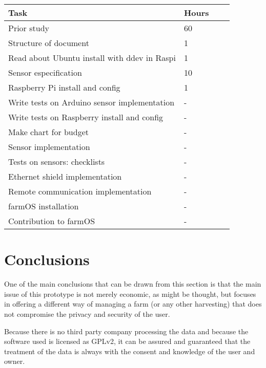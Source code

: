 \begin{table}[H]
\begin{tabular}{llll}
\hline
        \rowcolor{lightpurple}
                               \textbf{Task}   & \textbf{Hours} \\ \hline
\rowcolor{lightgray}                                           
Prior study                                     & 60           \\
Structure of document                           & 1 \\
\rowcolor{lightgray}                                           
Read about Ubuntu install with ddev in Raspi    & 1           \\
Sensor especification                           & 10           \\
\rowcolor{lightgray}                                           
Raspberry Pi install and config                 & 1           \\
Write tests on Arduino sensor implementation    & - \\
\rowcolor{lightgray}                                           
Write tests on Raspberry install and config     & - \\  
Make chart for budget                           & - \\
\rowcolor{lightgray}                                           
Sensor implementation                           & - \\
Tests on sensors: checklists                    & - \\
\rowcolor{lightgray}                                           
Ethernet shield implementation                  & - \\
Remote communication implementation             & - \\
\rowcolor{lightgray}                                           
farmOS installation                             & - \\
Contribution to farmOS                          & -
\end{tabular}
\end{table}

\section{Conclusions}
One of the main conclusions that can be drawn from this section is that the main issue of this prototype is not merely economic, as might be thought, but focuses in offering a different way of managing a farm (or any other harvesting) that does not compromise the privacy and security of the user.

Because there is no third party company processing the data and because the software used is licensed as GPLv2, it can be assured and guaranteed that the treatment of the data is always with the consent and knowledge of the user and owner.
